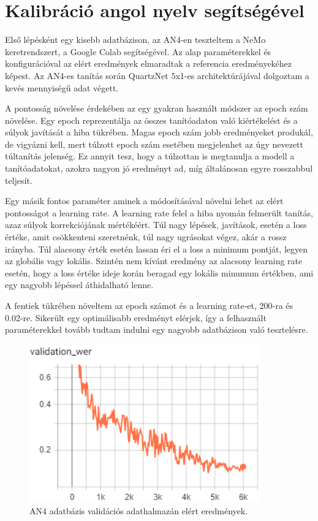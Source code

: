 \section{Kalibráció angol nyelv segítségével}

Első lépésként egy kisebb adatbázison, az AN4-en teszteltem a NeMo keretrendszert, a Google Colab segítségével. Az alap paraméterekkel és konfigurációval az elért eredmények elmaradtak a referencia eredményekéhez képest. Az AN4-es tanítás során QuartzNet 5x1-es architektúrájával dolgoztam a kevés mennyiségű adat végett.

A pontosság növelése érdekében az egy gyakran használt módszer az epoch szám növelése. Egy epoch reprezentálja az összes tanítóadaton való kiértékelést és a súlyok javítását a hiba tükrében. Magas epoch szám jobb eredményeket produkál, de vigyázni kell, mert túlzott epoch szám esetében megjelenhet az úgy nevezett túltanítás jelenség. Ez annyit tesz, hogy a túlzottan is megtanulja a modell a tanítóadatokat, azokra nagyon jó eredményt ad, míg általánosan egyre rosszabbul teljesít.

Egy másik fontos paraméter aminek a módosításával növelni lehet az elért pontosságot a learning rate. A learning rate felel a hiba nyomán felmerült tanítás, azaz súlyok korrekciójának mértékéért. Túl nagy lépések, javítások, esetén a loss értéke, amit csökkenteni szeretnénk, túl nagy ugrásokat végez, akár a rossz irányba. Túl alacsony érték esetén lassan éri el a loss a minimum pontját, legyen az globális vagy lokális. Szintén nem kívánt eredmény az alacsony learning rate esetén, hogy a loss értéke ideje korán beragad egy lokális minumum értékben, ami egy nagyobb lépéssel áthidalható lenne.


A fentiek tükrében növeltem az epoch számot és a learning rate-et, 200-ra és 0.02-re. Sikerült egy optimálisabb eredményt elérjek, így a felhasznált paraméterekkel tovább tudtam indulni egy nagyobb adatbázison való tesztelésre.

\begin{figure}[!ht]
\centering
\includegraphics[width=100mm, keepaspectratio]{figures/an4_wer.png}
\caption{AN4 adatbázis validációs adathalmazán elért eredmények.}
\label{fig:TeXstudio}
\end{figure}

